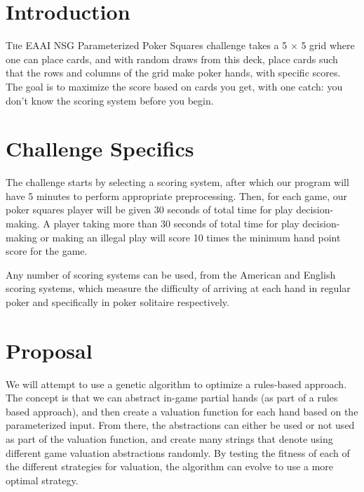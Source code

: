 \documentclass[twoside]{article}
\begin{document}
\begin{multicols}{2} %

\section{Introduction}

\lettrine[nindent=0em,lines=3]{T} he EAAI NSG Parameterized Poker Squares challenge takes a 5 $\times$ 5 grid where one can place cards, and with random draws from this deck, place cards such that the rows and columns of the grid make poker hands, with specific scores. The goal is to maximize the score based on cards you get, with one catch: you don't know the scoring system before you begin.


\section{Challenge Specifics}

The challenge starts by selecting a scoring system, after which our program will have 5 minutes to perform appropriate preprocessing. Then, for each game, our poker squares player will be given 30 seconds of total time for play decision-making. A player taking more than 30 seconds of total time for play decision-making or making an illegal play will score 10 times the minimum hand point score for the game.

Any number of scoring systems can be used, from the American and English scoring systems, which measure the difficulty of arriving at each hand in regular poker and specifically in poker solitaire respectively.

\section{Proposal}

We will attempt to use a genetic algorithm to optimize a rules-based approach. The concept is that we can abstract in-game partial hands (as part of a rules based approach), and then create a valuation function for each hand based on the parameterized input. From there, the abstractions can either be used or not used as part of the valuation function, and create many strings that denote using different game valuation abstractions randomly. By testing the fitness of each of the different strategies for valuation, the algorithm can evolve to use a more optimal strategy.


\end{multicols}
\end{document}
